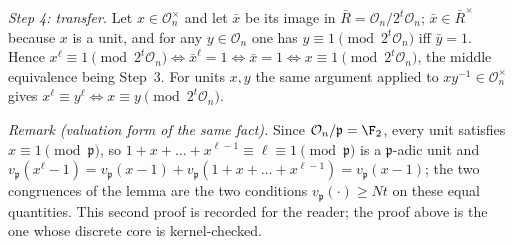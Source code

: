\emph{Step 4: transfer.} Let $x\in\mathcal O_n^\times$ and let $\bar x$ be its image in $\bar R=\mathcal O_n/2^t\mathcal O_n$; $\bar x\in\bar R^\times$ because $x$ is a unit, and for any $y\in\mathcal O_n$ one has $y\equiv1\pmod{2^t\mathcal O_n}$ iff $\bar y=1$. Hence $x^\ell\equiv1\pmod{2^t\mathcal O_n}\iff\bar x^{\ell}=1\iff\bar x=1\iff x\equiv1\pmod{2^t\mathcal O_n}$, the middle equivalence being Step~3. For units $x,y$ the same argument applied to $xy^{-1}\in\mathcal O_n^\times$ gives $x^\ell\equiv y^\ell\iff x\equiv y\pmod{2^t\mathcal O_n}$.

\emph{Remark (valuation form of the same fact).} Since $\mathcal O_n/\mathfrak p=\F_2$, every unit satisfies $x\equiv1\pmod{\mathfrak p}$, so $1+x+\dots+x^{\ell-1}\equiv\ell\equiv1\pmod{\mathfrak p}$ is a $\mathfrak p$-adic unit and $v_{\mathfrak p}(x^\ell-1)=v_{\mathfrak p}(x-1)+v_{\mathfrak p}(1+x+\dots+x^{\ell-1})=v_{\mathfrak p}(x-1)$; the two congruences of the lemma are the two conditions $v_{\mathfrak p}(\cdot)\ge Nt$ on these equal quantities. This second proof is recorded for the reader; the proof above is the one whose discrete core is kernel-checked.
